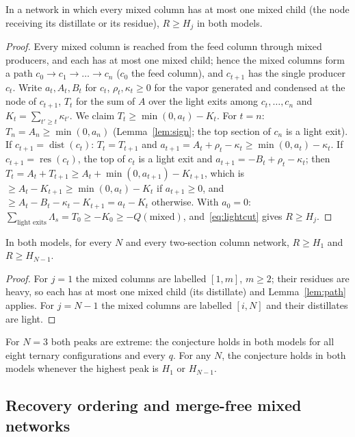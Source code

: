 \documentclass[11pt,a4paper]{report}
\newcommand{\Lam}{\Lambda}
\newcommand{\dist}{\operatorname{dist}}
\newcommand{\res}{\operatorname{res}}
\begin{document}
\begin{lemma}[path]\label{lem:path}
In a network in which every mixed column has at most one mixed child (the node receiving its distillate or its
residue), $R\ge H_j$ in both models.
\end{lemma}
\begin{proof}
Every mixed column is reached from the feed column through mixed producers, and each has at most one mixed child;
hence the mixed columns form a path $c_0\to c_1\to\dots\to c_n$ ($c_0$ the feed column), and $c_{t+1}$ has the single
producer $c_t$. Write $a_t,A_t,B_t$ for $c_t$, $\rho_t,\kappa_t\ge0$ for the vapor generated and condensed at the node of
$c_{t+1}$, $T_t$ for the sum of $A$ over the light exits among $c_t,\dots,c_n$ and $K_t=\sum_{t'\ge t}\kappa_{t'}$. We claim
$T_t\ge\min(0,a_t)-K_t$. For $t=n$: $T_n=A_n\ge\min(0,a_n)$ (Lemma~\ref{lem:sign}; the top section of $c_n$ is a light
exit). If $c_{t+1}=\dist(c_t)$: $T_t=T_{t+1}$ and $a_{t+1}=A_t+\rho_t-\kappa_t\ge\min(0,a_t)-\kappa_t$. If
$c_{t+1}=\res(c_t)$, the top of $c_t$ is a light exit and $a_{t+1}=-B_t+\rho_t-\kappa_t$; then
$T_t=A_t+T_{t+1}\ge A_t+\min(0,a_{t+1})-K_{t+1}$, which is $\ge A_t-K_{t+1}\ge\min(0,a_t)-K_t$ if $a_{t+1}\ge0$, and
$\ge A_t-B_t-\kappa_t-K_{t+1}=a_t-K_t$ otherwise. With $a_0=0$: $\sum_{\text{light exits}}\Lam_s=T_0\ge-K_0\ge-Q(\text{mixed})$,
and~\eqref{eq:lightcut} gives $R\ge H_j$.
\end{proof}

\begin{theorem}\label{thm:extreme}
In both models, for every $N$ and every two-section column network, $R\ge H_1$ and $R\ge H_{N-1}$.
\end{theorem}
\begin{proof}
For $j=1$ the mixed columns are labelled $[1,m]$, $m\ge2$; their residues are heavy, so each has at most one mixed
child (its distillate) and Lemma~\ref{lem:path} applies. For $j=N-1$ the mixed columns are labelled $[i,N]$ and
their distillates are light.
\end{proof}

\noindent For $N=3$ both peaks are extreme: the conjecture holds in both models for all eight ternary configurations
and every $q$. For any $N$, the conjecture holds in both models whenever the highest peak is $H_1$ or $H_{N-1}$.

\subsection{Recovery ordering and merge-free mixed networks}\label{sec:G}
\end{document}
